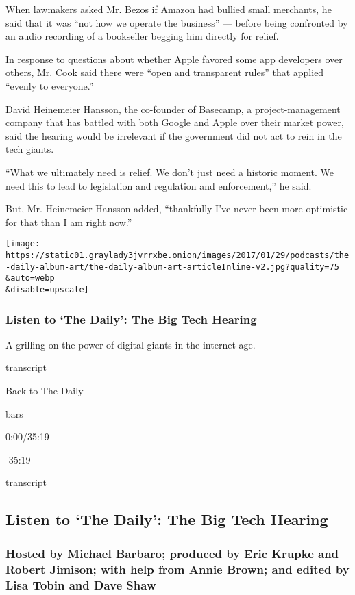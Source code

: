 When lawmakers asked Mr. Bezos if Amazon had bullied small merchants, he
said that it was ``not how we operate the business'' --- before being
confronted by an audio recording of a bookseller begging him directly
for relief.

In response to questions about whether Apple favored some app developers
over others, Mr. Cook said there were ``open and transparent rules''
that applied ``evenly to everyone.''

David Heinemeier Hansson, the co-founder of Basecamp, a
project-management company that has battled with both Google and Apple
over their market power, said the hearing would be irrelevant if the
government did not act to rein in the tech giants.

``What we ultimately need is relief. We don't just need a historic
moment. We need this to lead to legislation and regulation and
enforcement,'' he said.

But, Mr. Heinemeier Hansson added, ``thankfully I've never been more
optimistic for that than I am right now.''

\texttt{[image: https://static01.graylady3jvrrxbe.onion/images/2017/01/29/podcasts/the-daily-album-art/the-daily-album-art-articleInline-v2.jpg?quality=75\\\&auto=webp\\\&disable=upscale]}

\hypertarget{listen-to-the-daily-the-big-tech-hearing}{%
\subsubsection{Listen to `The Daily': The Big Tech
Hearing}\label{listen-to-the-daily-the-big-tech-hearing}}

A grilling on the power of digital giants in the internet age.

transcript

Back to The Daily

bars

0:00/35:19

-35:19

transcript

\hypertarget{listen-to-the-daily-the-big-tech-hearing-1}{%
\subsection{Listen to `The Daily': The Big Tech
Hearing}\label{listen-to-the-daily-the-big-tech-hearing-1}}

\hypertarget{hosted-by-michael-barbaro-produced-by-eric-krupke-and-robert-jimison-with-help-from-annie-brown-and-edited-by-lisa-tobin-and-dave-shaw}{%
\subsubsection{Hosted by Michael Barbaro; produced by Eric Krupke and
Robert Jimison; with help from Annie Brown; and edited by Lisa Tobin and
Dave
Shaw}\label{hosted-by-michael-barbaro-produced-by-eric-krupke-and-robert-jimison-with-help-from-annie-brown-and-edited-by-lisa-tobin-and-dave-shaw}}

